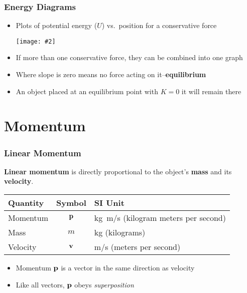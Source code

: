 \documentclass[12pt,compress,aspectratio=169]{beamer}
\newcommand{\pic}[2]{\texttt{[image: \#2]}}
\newcommand{\mb}[1]{\ensuremath\mathbf{#1}}
\newcommand{\eq}[2]{\vspace{#1}{\Large\begin{displaymath}#2\end{displaymath}}}
\begin{document}
\begin{frame}
  \frametitle{Energy Diagrams}
  \begin{itemize}
  \item Plots of potential energy ($U$) vs.\ position for a conservative force
    \begin{center}
      \pic{0.5}{energy-diagram.png}
    \end{center}
  \item If more than one conservative force, they can be combined into one graph
  \item Where slope is zero means no force acting on it--\textbf{equilibrium}
  \item An object placed at an equilibrium point with $K=0$ it will remain there
  \end{itemize}
\end{frame}

\section{Momentum}


\begin{frame}
  \frametitle{Linear Momentum}
  \textbf{Linear momentum} is directly proportional to the object's
  \textbf{mass} and its \textbf{velocity}.

  \eq{-.35in}{
    \boxed{\mb{p}=m\mb{v}}
  }
  \begin{center}
    \begin{tabular}{l|c|l}
      \rowcolor{pink}
      \textbf{Quantity} & \textbf{Symbol} & \textbf{SI Unit} \\ \hline
      Momentum & $\mb{p}$ & \si{kg.m/s} (kilogram meters per second) \\
      Mass      & $m$    & \si{kg} (kilograms) \\
      Velocity  & $\mb{v}$ & \si{m/s} (meters per second) \\
    \end{tabular}
  \end{center}
  \begin{itemize}
  \item Momentum $\mb{p}$ is a vector in the same direction as velocity
  \item Like all vectors, $\mb{p}$ obeys \emph{superposition}
  \end{itemize}
\end{frame}
\end{document}
